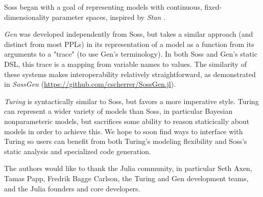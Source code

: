 \documentclass[anonymous=false, %
               format=acmsmall, %
               review=true, %
               screen=true, %
               nonacm=true]{acmart}
\begin{document}
Soss began with a goal of representing models with continuous, fixed-dimensionality parameter spaces, inspired by \emph{Stan} \cite{stan:2017}.

\emph{Gen} \cite{Cusumano-Towner:2019} was developed independently from Soss, but takes a similar approach (and distinct from most PPLs) in its representation of a model as a function from its arguments to a "trace" (to use Gen's terminology). In both Soss and Gen's static DSL, this trace is a mapping from variable names to values. The similarity of these systems makes interoperability relatively straightforward, as demonstrated in \emph{SossGen} (\url{https://github.com/cscherrer/SossGen.jl}). 

\emph{Turing} \cite{ge2018t} is syntactically similar to Soss, but favors a more imperative style. Turing can represent a wider variety of models than Soss, in particular Bayesian nonparameteric models, but sacrifices some ability to reason staticically about models in order to achieve this. We hope to soon find ways to interface with Turing so users can benefit from both Turing's modeling flexibility and Soss's static analysis and specialized code generation.

\begin{acks}
The authors would like to thank the Julia community, in particular Seth Axen, Tamas Papp, Fredrik Bagge Carlson, the Turing and Gen development teams, and the Julia founders and core developers. 
\end{acks}
 



\appendix

\end{document}
